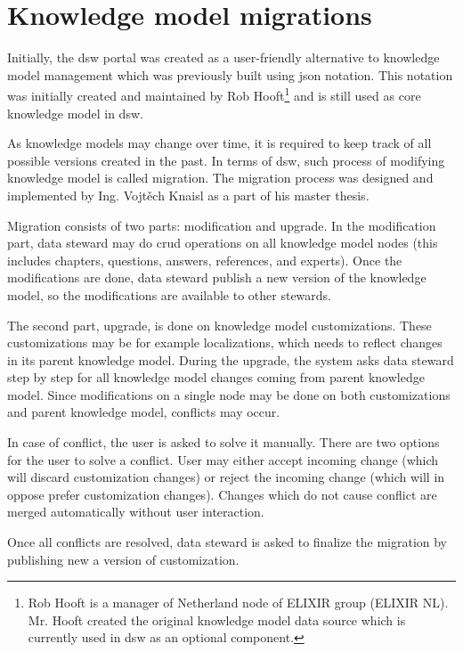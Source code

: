 \section{Knowledge model migrations}\label{sec:km-migrations}

Initially, the \gls{dsw} portal was created as a user-friendly alternative to knowledge model management which was previously built using \gls{json} notation.
This notation was initially created and maintained by Rob Hooft\footnote{Rob Hooft is a manager of Netherland node of ELIXIR group (ELIXIR NL). Mr. Hooft created the original knowledge model data source which is currently used in \gls{dsw} as an optional component.} and is still used as core knowledge model in \gls{dsw}.

As knowledge models may change over time, it is required to keep track of all possible versions created in the past.
In terms of \gls{dsw}, such process of modifying knowledge model is called migration.
The migration process was designed and implemented by Ing. Vojtěch Knaisl as a part of his master thesis\cite{mt-knaisl}.

Migration consists of two parts: modification and upgrade.
In the modification part, data steward may do \gls{crud} operations on all knowledge model nodes (this includes chapters, questions, answers, references, and experts).
Once the modifications are done, data steward publish a new version of the knowledge model, so the modifications are available to other stewards.

The second part, upgrade, is done on knowledge model customizations.
These customizations may be for example localizations, which needs to reflect changes in its parent knowledge model.
During the upgrade, the system asks data steward step by step for all knowledge model changes coming from parent knowledge model.
Since modifications on a single node may be done on both customizations and parent knowledge model, conflicts may occur.

In case of conflict, the user is asked to solve it manually.
There are two options for the user to solve a conflict.
User may either accept incoming change (which will discard customization changes) or reject the incoming change (which will in oppose prefer customization changes).
Changes which do not cause conflict are merged automatically without user interaction.

Once all conflicts are resolved, data steward is asked to finalize the migration by publishing new a version of customization.


